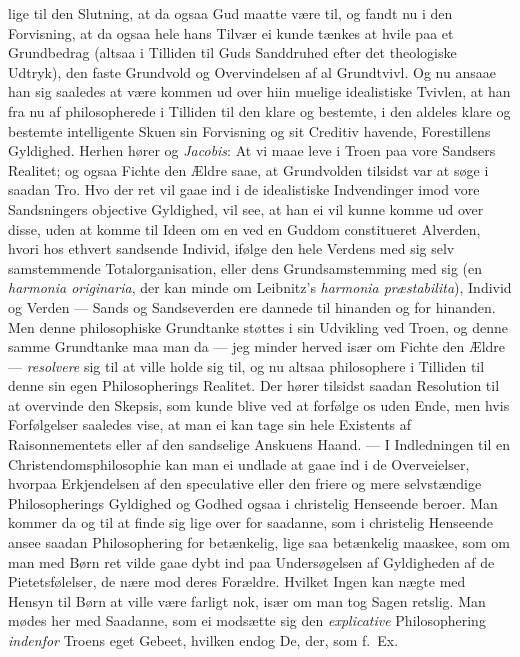 \documentclass[12pt,a4paper]{book}
\newcommand{\apage}[1]{\marginnote{\footnotesize\textit{[#1]}}}
\begin{document}
lige til den Slutning, at da ogsaa Gud maatte være til, og fandt nu i den
Forvisning, at da ogsaa hele hans Tilvær ei kunde tænkes at hvile paa et
Grundbedrag (altsaa i Tilliden til Guds Sanddruhed efter det theologiske
Udtryk), den faste Grundvold og Overvindelsen af al Grundtvivl. Og nu ansaae
han sig saaledes at være kommen ud over hiin muelige idealistiske Tvivlen, at
han fra nu af philosopherede i Tilliden til den klare og bestemte, i den
aldeles klare og bestemte intelligente Skuen sin Forvisning og sit Creditiv
\apage{114} havende, Forestillens Gyldighed. Herhen hører og \emph{Jacobis}: At vi maae leve i
Troen paa vore Sandsers Realitet; og ogsaa Fichte den Ældre saae, at
Grundvolden tilsidst var at søge i saadan Tro. Hvo der ret vil gaae ind i de
idealistiske Indvendinger imod vore Sandsningers objective Gyldighed, vil see,
at han ei vil kunne komme ud over disse, uden at komme til Ideen om en ved en
Guddom constitueret Alverden, hvori hos ethvert sandsende Individ, ifølge den
hele Verdens med sig selv samstemmende Totalorganisation, eller dens
Grundsamstemming med sig (en \textit{harmonia originaria}, der kan minde om
Leibnitz's \textit{harmonia præstabilita}), Individ og Verden --- Sands og
Sandseverden ere dannede til hinanden og for hinanden. Men denne philosophiske
Grundtanke støttes i sin Udvikling ved Troen, og denne samme Grundtanke maa
man da --- jeg minder herved især om Fichte den Ældre --- \emph{resolvere} sig til at
ville holde sig til, og nu altsaa philosophere i Tilliden til denne sin egen
Philosopherings Realitet. Der hører tilsidst saadan Resolution til at
overvinde den Skepsis, som kunde blive ved at forfølge os uden Ende, men hvis
Forfølgelser saaledes vise, at man ei kan tage sin hele Existents af
Raisonnementets eller af den sandselige Anskuens Haand. --- I Indledningen til
en Christendomsphilosophie kan man ei undlade at gaae ind i de Overveielser,
hvorpaa Erkjendelsen af den speculative eller den friere og mere selvstændige
Philosopherings Gyldighed og Godhed ogsaa i christelig Henseende beroer. Man
kommer da og til at finde sig lige over for saadanne, som i christelig
Henseende ansee saadan Philosophering for betænkelig, lige saa betænkelig
maaskee, som om man med Børn ret vilde gaae dybt ind paa Undersøgelsen af
Gyldigheden af de Pietetsfølelser, de nære mod deres Forældre. Hvilket Ingen
kan nægte med Hensyn til Børn at ville være farligt nok, især om man tog Sagen
retslig. Man mødes her med Saadanne, som ei modsætte sig den \emph{explicative}
Philosophering \emph{indenfor} Troens eget \apage{115} Gebeet, hvilken endog De, der, som f.\ Ex.\
\end{document}
